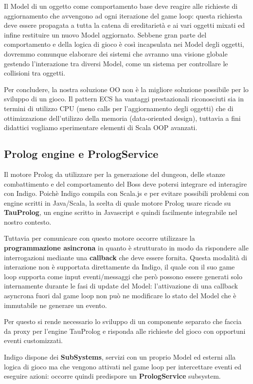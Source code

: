 Il Model di un oggetto come comportamento base deve reagire alle richieste di aggiornamento che avvengono ad ogni iterazione del game loop: questa richiesta deve essere propagata a tutta la catena di ereditarietà e ai vari oggetti mixati ed infine restituire un nuovo Model aggiornato.
Sebbene gran parte del comportamento e della logica di gioco è così incapsulata nei Model degli oggetti, dovremmo comunque elaborare dei sistemi che avranno una visione globale gestendo l'interazione tra diversi Model, come un sistema per controllare le collisioni tra oggetti.

Per concludere, la nostra soluzione OO non è la migliore soluzione possibile per lo sviluppo di un gioco. Il pattern ECS ha vantaggi prestazionali riconosciuti sia in termini di utilizzo CPU (meno calls per l'aggiornamento degli oggetti) che di ottimizzazione dell'utilizzo della memoria (data-oriented design), tuttavia a fini didattici vogliamo sperimentare elementi di Scala OOP avanzati.

\subsection{Prolog engine e PrologService}
Il motore Prolog da utilizzare per la generazione del dungeon, delle stanze combattimento e del comportamento del Boss deve potersi integrare ed interagire con Indigo.
Poichè Indigo compila con Scala.js e per evitare possibili problemi con engine scritti in Java/Scala, la scelta di quale motore Prolog usare ricade su \textbf{TauProlog}, un engine scritto in Javascript e quindi facilmente integrabile nel nostro contesto.

Tuttavia per comunicare con questo motore occorre utilizzare la \textbf{programmazione asincrona} in quanto è strutturato in modo da rispondere alle interrogazioni mediante una \textbf{callback} che deve essere fornita.
Questa modalità di interazione non è supportata direttamente da Indigo, il quale con il suo game loop supporta come input eventi/messaggi che però possono essere generati solo internamente durante le fasi di update del Model: l'attivazione di una callback asyncrona fuori dal game loop non può ne modificare lo stato del Model che è immutabile ne generare un evento.

Per questo si rende necessario lo sviluppo di un componente separato che faccia da proxy per l'engine TauProlog e risponda alle richieste del gioco con opportuni eventi customizzati.

Indigo dispone dei \textbf{SubSystems}, servizi con un proprio Model ed esterni alla logica di gioco ma che vengono attivati nel game loop per intercettare eventi ed eseguire azioni: occorre quindi predispore un \textbf{PrologService} subsystem.

